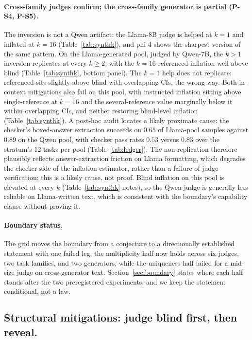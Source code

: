 \documentclass[11pt]{article}
\begin{document}
\paragraph{Cross-family judges confirm; the cross-family generator is partial (P-S4, P-S5).}
The inversion is not a Qwen artifact: the Llama-8B judge is helped at $k{=}1$ and inflated at $k{=}16$ (Table~\ref{tab:synthk}), and phi-4 shows the sharpest version of the same pattern.
On the Llama-generated pool, judged by Qwen-7B, the $k > 1$ inversion replicates at every $k \ge 2$, with the $k{=}16$ referenced inflation well above blind (Table~\ref{tab:synthk}, bottom panel).
The $k{=}1$ help does not replicate: referenced sits slightly above blind with overlapping CIs, the wrong way.
Both in-context mitigations also fail on this pool, with instructed inflation sitting above single-reference at $k{=}16$ and the several-reference value marginally below it within overlapping CIs, and neither restoring blind-level inflation (Table~\ref{tab:synthk}).
A post-hoc audit locates a likely proximate cause: the checker's boxed-answer extraction succeeds on $0.65$ of Llama-pool samples against $0.89$ on the Qwen pool, with checker pass rates $0.53$ versus $0.83$ over the stratum's 12 tasks per pool (Table~\ref{tab:ledger}).
The non-replication therefore plausibly reflects answer-extraction friction on Llama formatting, which degrades the checker side of the inflation estimator, rather than a failure of judge verification; this is a likely cause, not proof.
Blind inflation on this pool is elevated at every $k$ (Table~\ref{tab:synthk} notes), so the Qwen judge is generally less reliable on Llama-written text, which is consistent with the boundary's capability clause without proving it.

\paragraph{Boundary status.}
The grid moves the boundary from a conjecture to a directionally established statement with one failed leg: the multiplicity half now holds across six judges, two task families, and two generators, while the uniqueness half failed for a mid-size judge on cross-generator text.
Section~\ref{sec:boundary} states where each half stands after the two preregistered experiments, and we keep the statement conditional, not a law.

\FloatBarrier
\subsection{Structural mitigations: judge blind first, then reveal.}
\label{sec:struct}
\end{document}

